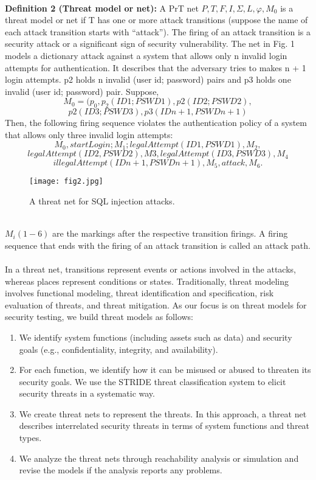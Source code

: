 \paragraph{}
\textbf{Definition 2 (Threat model or net):} A PrT net $P,T,F,I,\Sigma,L,\varphi,M_0$  is a threat model or net if T has one or more attack transitions (suppose the name of each attack transition starts with “attack”). The firing of an attack transition is a security attack or a significant sign of security vulnerability. The net in Fig. 1 models a dictionary attack against a
system that allows only n invalid login attempts for authentication. It describes that the adversary tries to makes n + 1 login attempts. p2 holds n invalid (user id; password) pairs and p3 holds one invalid (user id; password) pair.
Suppose, $$
M_0=(p_0,p_2(ID1; PSWD1), p2(ID2; PSWD2),$$  
       $$p2(ID3; PSWD3), p3(IDn + 1,PSWDn+1)
$$
Then, the following firing sequence violates the authentication policy of a system that allows only three invalid login
attempts:
$$M_0,startLogin; M_1 ; legalAttempt(ID1, PSWD1),M_2,$$
$$legalAttempt(ID2,PSWD2),M3,legalAttempt(ID3,PSWD3), M_4$$
$$ illegalAttempt(IDn + 1,PSWDn + 1), M_5, attack, M_6.$$
\begin{figure}
\centering
\texttt{[image: fig2.jpg]}
\caption{A threat net for SQL injection attacks.}
\label{fig:2}
\end{figure}
\\
$M_i(1 - 6)$ are the markings after the respective transition
firings. A firing sequence that ends with the firing of an
attack transition is called an attack path.
\paragraph{}
In a threat net, transitions represent events or actions involved in the attacks, whereas places represent conditions or states. Traditionally, threat modeling involves functional modeling, threat identification and specification, risk evaluation of threats, and threat mitigation. As our focus is on threat models for security testing, we build threat models as follows: 
\begin{enumerate}
\item We identify system functions (including assets such as data) and security goals (e.g., confidentiality, integrity, and availability).
\item For each function, we identify how it can be misused or abused to threaten its security goals. We use the STRIDE threat classification system to elicit security threats in a systematic way.
\item We create threat nets to represent the threats. In this approach, a
threat net describes interrelated security threats in terms of system functions and threat types.
\item We analyze the threat nets through reachability analysis or simulation and
revise the models if the analysis reports any problems.
\end{enumerate}

